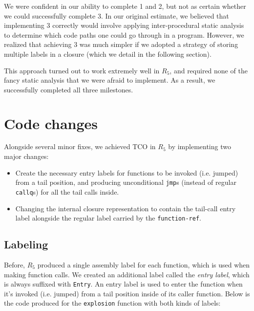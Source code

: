 \documentclass[12pt]{article}
\begin{document}
We were confident in our ability to complete 1 and 2, but not as certain whether
we could successfully complete 3. In our original estimate, we believed that
implementing 3 correctly would involve applying inter-procedural static analysis
to determine which code paths one could go through in a program. However, we
realized that achieving 3 was much simpler if we adopted a strategy of storing
multiple labels in a closure (which we detail in the following section).

This approach turned out to work extremely well in $R_5$, and required none of the
fancy static analysis that we were afraid to implement. As a result, we successfully
completed all three milestones.

\section{Code changes}
Alongside several minor fixes, we achieved TCO in $R_5$ by implementing
two major changes:

\begin{itemize}
\item Create the necessary entry labels for functions to be invoked
  (i.e. jumped) from a tail position, and producing unconditional
  \verb+jmp+s (instead of regular \verb+callq+s) for all the tail calls inside.
\item Changing the internal closure representation to contain the
  tail-call entry label alongside the regular label carried by the
  \verb+function-ref+.
\end{itemize}

\subsection{Labeling}

Before, $R_5$ produced a single assembly label for each function, which is used
when making function calls. We created an additional
label called the \emph{entry label}, which is always suffixed with \verb+Entry+.
An entry label is used to enter the function when it's invoked (i.e. jumped)
from a tail position inside of its caller function. Below is the code
produced for the \verb+explosion+ function with both kinds of labels:
\end{document}

